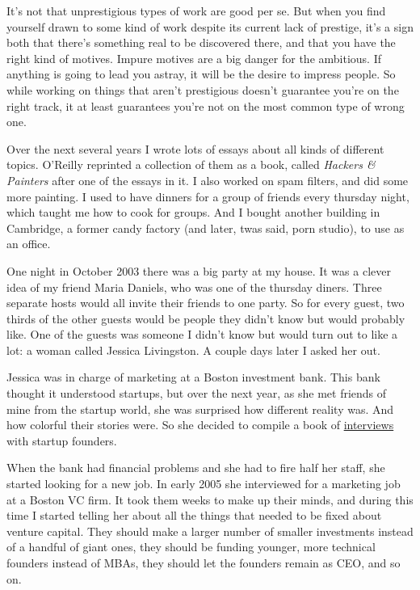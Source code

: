 It's not that unprestigious types of work are good per se. But when you
find yourself drawn to some kind of work despite its current lack of
prestige, it's a sign both that there's something real to be discovered
there, and that you have the right kind of motives. Impure motives are a
big danger for the ambitious. If anything is going to lead you astray,
it will be the desire to impress people. So while working on things that
aren't prestigious doesn't guarantee you're on the right track, it at
least guarantees you're not on the most common type of wrong one.

Over the next several years I wrote lots of essays about all kinds of
different topics. O'Reilly reprinted a collection of them as a book,
called \emph{Hackers \& Painters} after one of the essays in it. I also
worked on spam filters, and did some more painting. I used to have
dinners for a group of friends every thursday night, which taught me how
to cook for groups. And I bought another building in Cambridge, a former
candy factory (and later, twas said, porn studio), to use as an office.

One night in October 2003 there was a big party at my house. It was a
clever idea of my friend Maria Daniels, who was one of the thursday
diners. Three separate hosts would all invite their friends to one
party. So for every guest, two thirds of the other guests would be
people they didn't know but would probably like. One of the guests was
someone I didn't know but would turn out to like a lot: a woman called
Jessica Livingston. A couple days later I asked her out.

Jessica was in charge of marketing at a Boston investment bank. This
bank thought it understood startups, but over the next year, as she met
friends of mine from the startup world, she was surprised how different
reality was. And how colorful their stories were. So she decided to
compile a book of
\href{https://www.amazon.com/Founders-Work-Stories-Startups-Early/dp/1430210788}{interviews}
with startup founders.

When the bank had financial problems and she had to fire half her staff,
she started looking for a new job. In early 2005 she interviewed for a
marketing job at a Boston VC firm. It took them weeks to make up their
minds, and during this time I started telling her about all the things
that needed to be fixed about venture capital. They should make a larger
number of smaller investments instead of a handful of giant ones, they
should be funding younger, more technical founders instead of MBAs, they
should let the founders remain as CEO, and so on.

